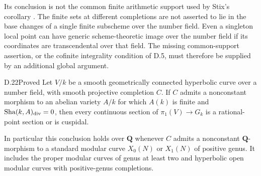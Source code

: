 Its conclusion is not the common finite arithmetic support used by
Stix's corollary \cite[Section~3, Corollary~5]{D_Stix2015}. The finite
sets at different completions are not asserted to lie in the base
changes of a single finite subscheme over the number field. Even a
singleton local point can have generic scheme-theoretic image over
the number field if its coordinates are transcendental over that
field. The missing common-support assertion, or the cofinite
integrality condition of D.5, must therefore be supplied by an
additional global argument.

\begin{claim}{D.22}{Proved}\label{clm:D22}
Let $V/k$ be a smooth geometrically connected hyperbolic curve over a
number field, with smooth projective completion $C$. If $C$ admits a
nonconstant morphism to an abelian variety $A/k$ for which $A(k)$ is
finite and $\operatorname{Sha}(k,A)_{\mathrm{div}}=0$, then every continuous section
of $\pi_1(V)\to G_k$ is a rational-point section or is cuspidal.

In particular this conclusion holds over $\mathbf Q$ whenever $C$
admits a nonconstant $\mathbf Q$-morphism to a standard modular curve
$X_0(N)$ or $X_1(N)$ of positive genus. It includes the proper modular
curves of genus at least two and hyperbolic open modular curves with
positive-genus completions.
\end{claim}
